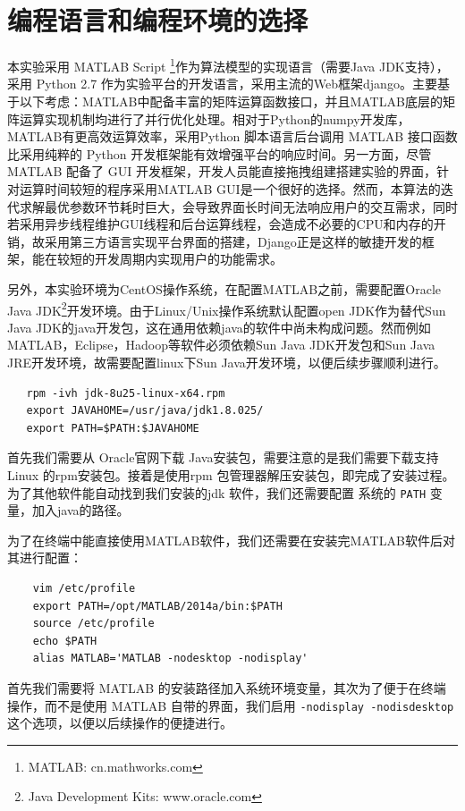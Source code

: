 \documentclass[oneside]{ZJUthesis}
\begin{document}
\section{编程语言和编程环境的选择}
本实验采用 MATLAB Script \footnote{MATLAB: cn.mathworks.com}作为算法模型的实现语言（需要Java JDK支持），采用 Python 2.7 作为实验平台的开发语言，采用主流的Web框架django。主要基于以下考虑：MATLAB中配备丰富的矩阵运算函数接口，并且MATLAB底层的矩阵运算实现机制均进行了并行优化处理。相对于Python的numpy开发库，MATLAB有更高效运算效率，采用Python 脚本语言后台调用 MATLAB 接口函数比采用纯粹的 Python 开发框架能有效增强平台的响应时间。另一方面，尽管 MATLAB 配备了 GUI 开发框架，开发人员能直接拖拽组建搭建实验的界面，针对运算时间较短的程序采用MATLAB GUI是一个很好的选择。然而，本算法的迭代求解最优参数环节耗时巨大，会导致界面长时间无法响应用户的交互需求，同时若采用异步线程维护GUI线程和后台运算线程，会造成不必要的CPU和内存的开销，故采用第三方语言实现平台界面的搭建，Django正是这样的敏捷开发的框架，能在较短的开发周期内实现用户的功能需求。

另外，本实验环境为CentOS操作系统，在配置MATLAB之前，需要配置Oracle Java JDK\footnote{Java Development Kits: www.oracle.com}开发环境。由于Linux/Unix操作系统默认配置open JDK作为替代Sun Java JDK的java开发包，这在通用依赖java的软件中尚未构成问题。然而例如MATLAB，Eclipse，Hadoop等软件必须依赖Sun Java JDK开发包和Sun Java JRE开发环境，故需要配置linux下Sun Java开发环境，以便后续步骤顺利进行。
\begin{verbatim}
   rpm -ivh jdk-8u25-linux-x64.rpm         
   export JAVAHOME=/usr/java/jdk1.8.025/  
   export PATH=$PATH:$JAVAHOME
\end{verbatim}
首先我们需要从 Oracle官网下载 Java安装包，需要注意的是我们需要下载支持 Linux 的rpm安装包。接着是使用rpm 包管理器解压安装包，即完成了安装过程。为了其他软件能自动找到我们安装的jdk 软件，我们还需要配置 系统的 \texttt{PATH} 变量，加入java的路径。



为了在终端中能直接使用MATLAB软件，我们还需要在安装完MATLAB软件后对其进行配置：
\begin{verbatim}
    vim /etc/profile
    export PATH=/opt/MATLAB/2014a/bin:$PATH
    source /etc/profile
    echo $PATH
    alias MATLAB='MATLAB -nodesktop -nodisplay'
\end{verbatim}
首先我们需要将 MATLAB 的安装路径加入系统环境变量，其次为了便于在终端操作，而不是使用 MATLAB 自带的界面，我们启用 \texttt{-nodisplay -nodisdesktop}这个选项，以便以后续操作的便捷进行。
\end{document}
